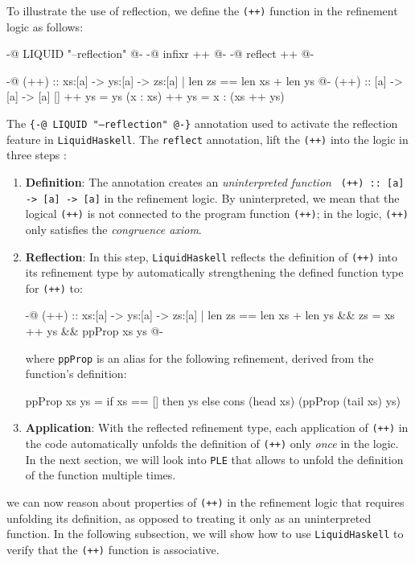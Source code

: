 \documentclass[]{rptuseminar}
\begin{document}
To illustrate the use of reflection, we define the \texttt{(++)} function in the refinement logic as follows:

\begin{haskell}
{-@ LIQUID "--reflection" @-}
{-@ infixr ++ @-}
{-@ reflect ++ @-}

{-@ (++) :: xs:[a] -> ys:[a] -> { zs:[a] | len zs == len xs + len ys } @-}
(++) :: [a] -> [a] -> [a]
[] ++ ys = ys
(x : xs) ++ ys = x : (xs ++ ys)
\end{haskell}
The \texttt{\{-@ LIQUID "--reflection" @-\}} annotation used to activate the reflection feature in \texttt{LiquidHaskell}.
The \texttt{reflect} annotation, lift the \texttt{(++)} into the logic in three steps \cite{vazou_refinement_2018}:
\begin{enumerate}
  \item \textbf{Definition}: The annotation creates an \textit{uninterpreted function} \texttt{
    (++) :: [a] -> [a] -> [a]} in the refinement logic. By uninterpreted, we mean that the logical \texttt{(++)} is
    not connected to the program function \texttt{(++)}; in the logic, \texttt{(++)} only satisfies the \textit{congruence axiom}.
  \item \textbf{Reflection}: In this step, \texttt{LiquidHaskell} reflects the definition of \texttt{(++)} into its refinement type
    by automatically strengthening the defined function type for \texttt{(++)} to:

\begin{haskell}
  {-@ (++) :: xs:[a] -> ys:[a] -> { zs:[a] | len zs == len xs + len ys 
                                             && zs = xs ++ ys 
                                             && ppProp xs ys } 
  @-}
\end{haskell}
where \texttt{ppProp} is an alias for the following refinement, derived from the function's definition:
\begin{haskell}
  ppProp xs ys = if xs == [] then ys 
                 else cons (head xs) (ppProp (tail xs) ys) 
            
\end{haskell}
\item \textbf{Application}: With the reflected refinement type, each application of \texttt{(++)} 
  in the code automatically unfolds the definition of \texttt{(++)} only \textit{once} in the logic. In the
  next section, we will look into \texttt{PLE} that allows to unfold the definition of the function multiple times.
\end{enumerate}
we can now reason about properties of \texttt{(++)} in the refinement logic that requires unfolding its definition, as opposed to treating it only as an uninterpreted function.
In the following subsection, we will show how to use \texttt{LiquidHaskell} to verify that the \texttt{(++)} function is associative.
\end{document}
